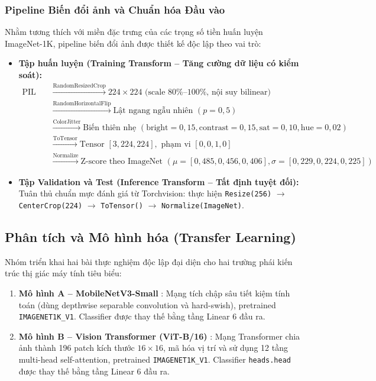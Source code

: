 \documentclass[a4paper,11pt]{article}
\begin{document}
\subsubsection{Pipeline Biến đổi ảnh và Chuẩn hóa Đầu vào}
Nhằm tương thích với miền đặc trưng của các trọng số tiền huấn luyện ImageNet-1K, pipeline biến đổi ảnh được thiết kế độc lập theo vai trò:
\begin{itemize}
    \item \textbf{Tập huấn luyện (Training Transform -- Tăng cường dữ liệu có kiểm soát):}
    \begin{align*}
        \text{PIL Image} &\xrightarrow{\text{RandomResizedCrop}} 224 \times 224 \text{ (scale 80\%--100\%, nội suy bilinear)} \\
        &\xrightarrow{\text{RandomHorizontalFlip}} \text{Lật ngang ngẫu nhiên } (p=0{,}5) \\
        &\xrightarrow{\text{ColorJitter}} \text{Biến thiên nhẹ } (\text{bright}=0{,}15, \text{contrast}=0{,}15, \text{sat}=0{,}10, \text{hue}=0{,}02) \\
        &\xrightarrow{\text{ToTensor}} \text{Tensor } [3, 224, 224], \text{ phạm vi } [0{,}0, 1{,}0] \\
        &\xrightarrow{\text{Normalize}} \text{Z-score theo ImageNet } (\mu=[0{,}485, 0{,}456, 0{,}406], \sigma=[0{,}229, 0{,}224, 0{,}225])
    \end{align*}
    \item \textbf{Tập Validation và Test (Inference Transform -- Tất định tuyệt đối):} Tuân thủ chuẩn mực đánh giá từ Torchvision: thực hiện \texttt{Resize(256)} $\to$ \texttt{CenterCrop(224)} $\to$ \texttt{ToTensor()} $\to$ \texttt{Normalize(ImageNet)}.
\end{itemize}

\subsection{Phân tích và Mô hình hóa (Transfer Learning)}
Nhóm triển khai hai bài thực nghiệm độc lập đại diện cho hai trường phái kiến trúc thị giác máy tính tiêu biểu:
\begin{enumerate}
    \item \textbf{Mô hình A -- MobileNetV3-Small} \cite{mobilenetv3}: Mạng tích chập sâu tiết kiệm tính toán (dùng depthwise separable convolution và hard-swish), pretrained \texttt{IMAGENET1K\_V1}. Classifier được thay thế bằng tầng Linear 6 đầu ra.
    \item \textbf{Mô hình B -- Vision Transformer (ViT-B/16)} \cite{vit}: Mạng Transformer chia ảnh thành 196 patch kích thước $16 \times 16$, mã hóa vị trí và sử dụng 12 tầng multi-head self-attention, pretrained \texttt{IMAGENET1K\_V1}. Classifier \texttt{heads.head} được thay thế bằng tầng Linear 6 đầu ra.
\end{enumerate}
\end{document}
